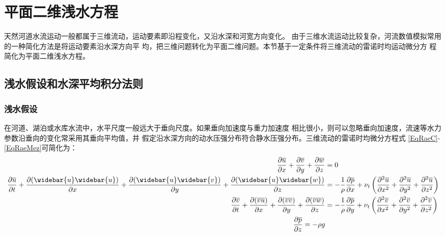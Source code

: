 \section{平面二维浅水方程}
天然河道水流运动一般都属于三维流动，运动要素即沿程变化，又沿水深和河宽方向变化。
由于三维水流运动比较复杂，河流数值模拟常用的一种简化方法是将运动要素沿水深方向平
均，把三维问题转化为平面二维问题。本节基于一定条件将三维流动的雷诺时均运动微分方
程简化为平面二维浅水方程。
\subsection{浅水假设和水深平均积分法则}
\subsubsection{浅水假设}
在河道、湖泊或水库水流中，水平尺度一般远大于垂向尺度。如果垂向加速度与重力加速度
相比很小，则可以忽略垂向加速度，流速等水力参数沿垂向的变化常采用其垂向平均值，并
假定沿水深方向的动水压强分布符合静水压强分布。三维流动的雷诺时均微分方程式
\eqref{EqRaeC}-\eqref{EqRaeMez}可简化为：
\begin{subequations}
  \begin{align}
    \frac{\partial \overline{u}}{\partial x} +
    \frac{\partial \overline{v}}{\partial y} +
    \frac{\partial \overline{w}}{\partial z}
    &
    =
    0
    \label{EqRaeCSimp}
    \\
    \frac{\partial \overline{u}}{\partial t} +
    \frac{\partial (\widebar{u}\widebar{u})}{\partial x} +
    \frac{\partial (\widebar{u}\widebar{v})}{\partial y} +
    \frac{\partial (\widebar{u}\widebar{w})}{\partial z}
    &
    =
    -\frac{1}{\rho}\frac{\partial \overline{p}}{\partial x} +
    \nu_{t}
    \left(
    \frac{\partial^{2} \overline{u}}{\partial x^{2}} +
    \frac{\partial^{2} \overline{u}}{\partial y^{2}} +
    \frac{\partial^{2} \overline{u}}{\partial z^{2}}
    \right)
    \label{EqRaeMexSimp}
    \\
    \frac{\partial \overline{v}}{\partial t} +
    \frac{\partial (\overline{v}\overline{u})}{\partial x} +
    \frac{\partial (\overline{v}\overline{v})}{\partial y} +
    \frac{\partial (\overline{v}\overline{w})}{\partial z}
    &
    =
    -\frac{1}{\rho}\frac{\partial \overline{p}}{\partial y} +
    \nu_{t}
    \left(
    \frac{\partial^{2} \overline{v}}{\partial x^{2}} +
    \frac{\partial^{2} \overline{v}}{\partial y^{2}} +
    \frac{\partial^{2} \overline{v}}{\partial z^{2}}
    \right)
    \label{EqRaeMeySimp}
    \\
    \frac{\partial \overline{p}}{\partial z}
    =
    -\rho g
    \label{EqRaeMezSimp}
  \end{align}
  \label{EqRae}
\end{subequations}


